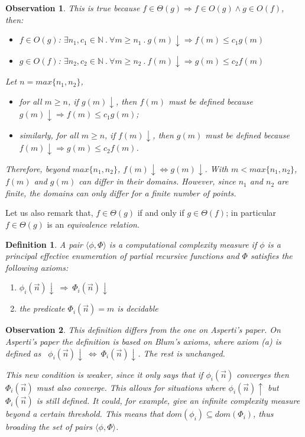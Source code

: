 \documentclass[10pt, a4paper, oneside, titlepage, draft]{article}
\newtheorem{definition}[shrd]{Definition}
\newtheorem{observation}{Observation}[shrd]
\begin{document}
\begin{observation}
    This is true because $f \in \Theta(g) \Rightarrow f \in O(g) \wedge g \in O(f)$, then:
    \begin{itemize}
        \item $f \in O(g) $: $ \exists n_1, c_1 \in \mathbb{N} \ . \ \forall m \ge n_1 \ . \ g(m)\downarrow \Rightarrow f(m) \le c_1g(m)$
        \item $g \in O(f) $: $ \exists n_2, c_2 \in \mathbb{N} \ . \ \forall m \ge n_2 \ . \ f(m)\downarrow \Rightarrow g(m) \le c_2f(m)$
    \end{itemize}
    Let $n = max\{n_1, n_2\}$,
    \begin{itemize}
        \item for all $m \ge n$, if $g(m)\downarrow$, then $f(m)$ must be defined because $ g(m)\downarrow \Rightarrow f(m) \le c_1g(m)$;
        \item similarly, for all $m \ge n$, if $f(m) \downarrow$, then $g(m)$ must be defined because $f(m) \downarrow \Rightarrow g(m) \le c_2f(m)$.
    \end{itemize}
    Therefore, beyond $max\{n_1, n_2\}$, $f(m) \downarrow \iff g(m) \downarrow$. With $m < max\{n_1, n_2\}$, $f(m)$ and $g(m)$ can differ in their domains. However, since $n_1$ and $n_2$ are finite, the domains can only differ for a finite number of points.
\end{observation}

Let us also remark that, $f \in \Theta(g)$ if and only if $g \in \Theta(f)$; in particular $f \in \Theta(g)$ is an \emph{equivalence relation}.

\begin{definition}
    A pair $\langle \phi, \Phi \rangle$ is a \textit{computational complexity measure} if $\phi$ is a principal effective enumeration of partial recursive functions and $\Phi$ satisfies the following axioms: 
    \begin{enumerate}[label=(\alph*)]
        \item $ \phi_i(\vec{n})\downarrow \ \Rightarrow \ \Phi_i(\vec{n}) \downarrow $ 
        \item the predicate $ \Phi_i(\vec{n}) = m $ is decidable
    \end{enumerate}
\end{definition}


\begin{observation}
    This definition differs from the one on Asperti's paper. On Asperti's paper the definition is based on Blum's axioms, where axiom (a) is defined as \ $\phi_i(\vec{n})\downarrow \ \iff \ \Phi_i(\vec{n}) \downarrow$. The rest is unchanged.

    This new condition is weaker, since it only says that if $\phi_i(\vec{n})$ converges then $\Phi_i(\vec{n})$ must also converge. This allows for situations where $\phi_i(\vec{n})\uparrow$ but $\Phi_i(\vec{n})$ is still defined. It could, for example, give an infinite complexity measure beyond a certain threshold. 
    This means that $dom(\phi_i) \subseteq dom(\Phi_i)$, thus broading the set of pairs $\langle \phi, \Phi \rangle$.
\end{observation}
\end{document}
